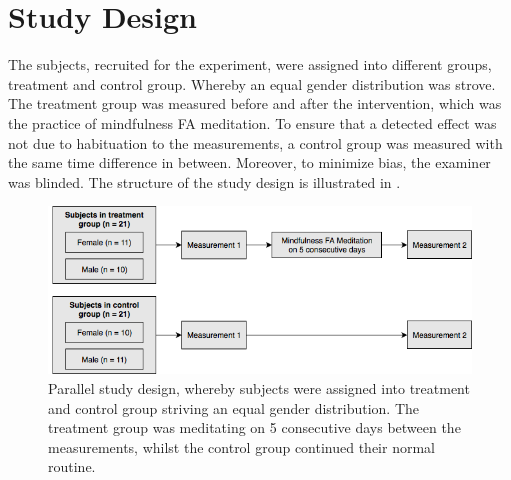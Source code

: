 \vspace{-.5cm}

\section{Study Design} 

The subjects, recruited for the experiment, were assigned into different groups, treatment and control group. Whereby an equal gender distribution was strove. The treatment group was measured before and after the intervention, which was the practice of mindfulness FA meditation. To ensure that a detected effect was not due to habituation to the measurements, a control group was measured with the same time difference in between. Moreover, to minimize bias, the examiner was blinded. The structure of the study design is illustrated in .

\begin{figure}[H]
	\includegraphics[width=1\textwidth]{figures/studydesign.png} 
	\caption{Parallel study design, whereby subjects were assigned into treatment and control group striving an equal gender distribution. The treatment group was meditating on 5 consecutive days between the measurements, whilst the control group continued their normal routine.}
	\label{fig:studydesign}  
\end{figure}  


